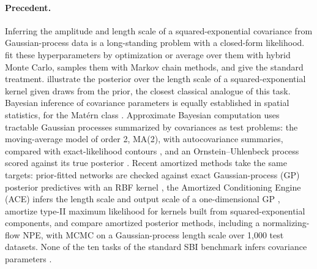 \documentclass[11pt]{article}
\begin{document}
\paragraph{Precedent.}
Inferring the amplitude and length scale of a squared-exponential covariance from Gaussian-process data is a
long-standing problem with a closed-form likelihood. \citet{williams1996gp} fit these hyperparameters by
optimization or average over them with hybrid Monte Carlo, \citet{neal1997mc} samples them with Markov chain
methods, and \citet{rasmussen2006gpml} give the standard treatment. \citet{murray2010slice} illustrate the posterior
over the length scale of a squared-exponential kernel given draws from the prior, the closest classical analogue of
this task. Bayesian inference of covariance parameters is equally established in spatial statistics, for the
Mat\'ern class \citep{handcock1993bayesian}. Approximate Bayesian computation uses tractable Gaussian processes
summarized by covariances as test problems: the
moving-average model of order 2, MA(2), with autocovariance summaries, compared with
exact-likelihood contours \citep{marin2012abc}, and an Ornstein--Uhlenbeck process scored against its true posterior
\citep{chen2021nass}. Recent amortized methods take the same targets: prior-fitted networks are checked against exact
Gaussian-process (GP) posterior predictives with an RBF kernel \citep{muller2022pfn}, the Amortized Conditioning
Engine (ACE) infers the length scale and output scale of a
one-dimensional GP \citep{chang2024ace}, \citet{bitzer2023amortized} amortize type-II maximum likelihood for kernels
built from squared-exponential components, and \citet{zammitmangion2024neural} compare amortized posterior methods,
including a normalizing-flow NPE, with MCMC on a Gaussian-process length scale over 1{,}000 test datasets. None of
the ten tasks of the standard SBI benchmark infers covariance parameters \citep{lueckmann2021benchmark}.
\end{document}
